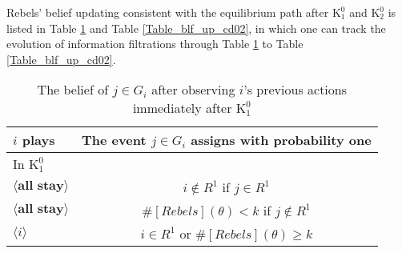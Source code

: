 \documentclass[12pt,letter]{article}
\newcommand{\Kappa}{\mathrm{K}}
\theoremstyle{definition}
\theoremstyle{remark}
\theoremstyle{claim}
\begin{document}
\clearpage

Rebels' belief updating consistent with the equilibrium path after $\Kappa^0_1$ and $\Kappa^0_2$ is listed in Table \ref{Table_blf_up_cd01} and Table \ref{Table_blf_up_cd02}, in which one can track the evolution of information filtrations through Table \ref{Table_blf_up_cd01} to Table \ref{Table_blf_up_cd02}.

\begin{table}[!htbp]
\caption{The belief of $j\in G_i$ after observing $i$'s previous actions immediately after $\Kappa^0_{1}$}
\label{Table_blf_up_cd01}
\begin{center}
\begin{tabular}{l | c}
 	$i$ plays	  				  &  The event $j\in G_i$ assigns with probability one\\
\hline
\hline
In $\Kappa^0_{1}$	&				  \\
\hline
  $\langle \textbf{all stay} \rangle$	&    $i\notin R^1$ if $j\in R^1$ \\
  $\langle \textbf{all stay} \rangle$	&    $\#[Rebels](\theta)< k$ if $j\notin R^1$\\
  $\langle i \rangle$	&	  $i\in R^1$ or $\#[Rebels](\theta)\geq k$    \\
  \hline
\end{tabular}
\end{center}
\end{table}
\end{document}
